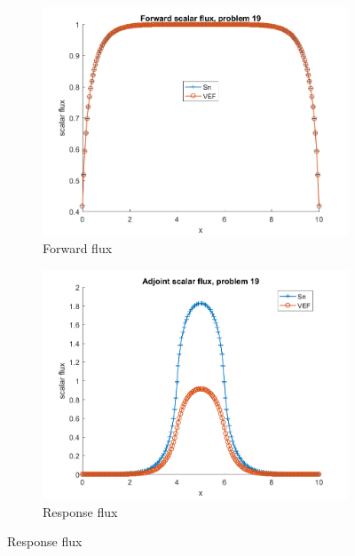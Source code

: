 \documentclass{article}
\begin{document}
\begin{figure}[H]
\label{InHomoPertq}
\centering
\begin{subfigure}{.5\textwidth}
  \centering
  \includegraphics[width=.98\linewidth]{IanProposal/figures2/19phi.png}
  \caption{Forward flux}
  \label{fig:sfig1}
\end{subfigure}%
\begin{subfigure}{.5\textwidth}
  \centering
  \includegraphics[width=.98\linewidth]{IanProposal/figures2/19phia.png}
  \caption{Response flux}
  \label{fig:sfig4}
\end{subfigure}%
\end{figure}
\end{document}

